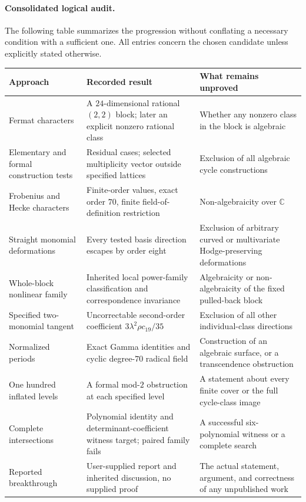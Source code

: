 \documentclass[11pt]{article}
\newcommand{\C}{\mathbb C}
\begin{document}
\paragraph{Consolidated logical audit.}
The following table summarizes the progression without conflating a
necessary condition with a sufficient one. All entries concern the chosen
candidate unless explicitly stated otherwise.
\begin{longtable}{@{}L{0.24\textwidth}L{0.36\textwidth}L{0.34\textwidth}@{}}
\toprule
Approach & Recorded result & What remains unproved\\
\midrule\endhead
Fermat characters & A $24$-dimensional rational $(2,2)$ block; later an explicit nonzero rational class & Whether any nonzero class in the block is algebraic\\
Elementary and formal construction tests & Residual cases; selected multiplicity vector outside specified lattices & Exclusion of all algebraic cycle constructions\\
Frobenius and Hecke characters & Finite-order values, exact order $70$, finite field-of-definition restriction & Non-algebraicity over $\C$\\
Straight monomial deformations & Every tested basis direction escapes by order eight & Exclusion of arbitrary curved or multivariate Hodge-preserving deformations\\
Whole-block nonlinear family & Inherited local power-family classification and correspondence invariance & Algebraicity or non-algebraicity of the fixed pulled-back block\\
Specified two-monomial tangent & Uncorrectable second-order coefficient $3\lambda^2\rho c_{19}/35$ & Exclusion of all other individual-class directions\\
Normalized periods & Exact Gamma identities and cyclic degree-$70$ radical field & Construction of an algebraic surface, or a transcendence obstruction\\
One hundred inflated levels & A formal mod-$2$ obstruction at each specified level & A statement about every finite cover or the full cycle-class image\\
Complete intersections & Polynomial identity and determinant-coefficient witness target; paired family fails & A successful six-polynomial witness or a complete search\\
Reported breakthrough & User-supplied report and inherited discussion, no supplied proof & The actual statement, argument, and correctness of any unpublished work\\
\bottomrule
\end{longtable}
\end{document}
